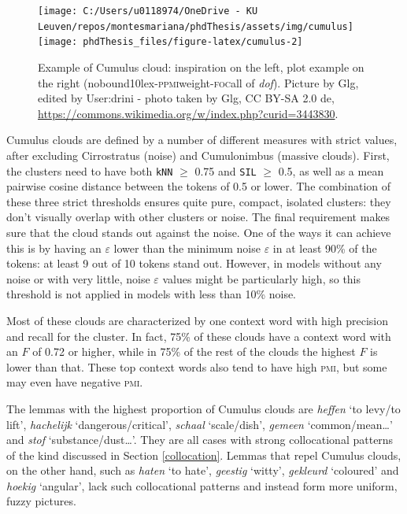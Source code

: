 \documentclass[
]{book}
\begin{document}
\begin{figure}
\texttt{[image: C:/Users/u0118974/OneDrive - KU Leuven/repos/montesmariana/phdThesis/assets/img/cumulus]} \texttt{[image: phdThesis\_files/figure-latex/cumulus-2]} \caption{Example of Cumulus cloud: inspiration on the left, plot example on the right (nobound10lex-\textsc{ppmi}weight-\textsc{foc}all of \emph{dof}). Picture by Glg, edited by User:drini - photo taken by Glg, CC BY-SA 2.0 de, \url{https://commons.wikimedia.org/w/index.php?curid=3443830}.}\label{fig:cumulus}
\end{figure}

Cumulus clouds are defined by a number of different measures with strict values, after excluding Cirrostratus (noise) and Cumulonimbus (massive clouds).
First, the clusters need to have both \texttt{kNN} \(\ge\) 0.75 and \texttt{SIL} \(\ge\) 0.5, as well as a mean pairwise cosine distance between the tokens of 0.5 or lower. The combination of these three strict thresholds ensures quite pure, compact, isolated clusters: they don't visually overlap with other clusters or noise. The final requirement makes sure that the cloud stands out against the noise. One of the ways it can achieve this is by having an \(\varepsilon\) lower than the minimum noise \(\varepsilon\) in at least 90\% of the tokens: at least 9 out of 10 tokens stand out. However, in models without any noise or with very little, noise \(\varepsilon\) values might be particularly high, so this threshold is not applied in models with less than 10\% noise.

Most of these clouds are characterized by one context word with high precision and recall for the cluster. In fact, 75\% of these clouds have a context word with an \(F\) of
0.72 or higher, while in 75\% of the rest of the clouds the highest \(F\) is lower than that. These top context words also tend to have high \textsc{pmi}, but some may even have negative \textsc{pmi}.

The lemmas with the highest proportion of Cumulus clouds are \emph{heffen} `to levy/to lift', \emph{hachelijk} `dangerous/critical', \emph{schaal} `scale/dish', \emph{gemeen} `common/mean\ldots{}' and \emph{stof} `substance/dust\ldots{}'. They are all cases with strong collocational patterns of the kind discussed in Section \ref{collocation}. Lemmas that repel Cumulus clouds, on the other hand, such as \emph{haten} `to hate', \emph{geestig} `witty', \emph{gekleurd} `coloured' and \emph{hoekig} `angular', lack such collocational patterns and instead form more uniform, fuzzy pictures.
\end{document}
